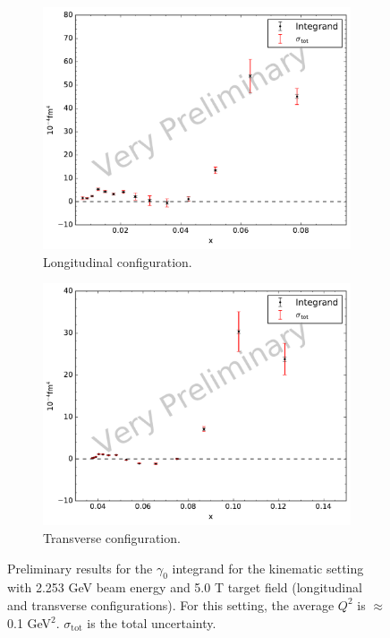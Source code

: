 \begin{figure}[p!]
  \centering
  \begin{subfigure}[t]{0.79\textwidth}
    \includegraphics[width=\textwidth]{figs/gamma0-model-22535000.pdf}
    \caption{Longitudinal configuration. \label{C8S5F1a}}
  \end{subfigure}
  \begin{subfigure}[t]{0.79\textwidth}
    \includegraphics[width=\textwidth]{figs/gamma0-model-22535090.pdf}
    \caption{Transverse configuration. \label{C8S5F1b}}
  \end{subfigure}
  \caption[$\gamma_0$ integrand with $E=2.253$ GeV and $B=5.0$ T.]{Preliminary results for the $\gamma_0$ integrand for the kinematic setting with 2.253 GeV beam energy and 5.0 T target field (longitudinal and transverse configurations). For this setting, the average $Q^2$ is $\approx$ 0.1 GeV${}^2$. $\sigma_{\mathrm{tot}}$ is the total uncertainty. \label{C8S5F1}}
\end{figure}

